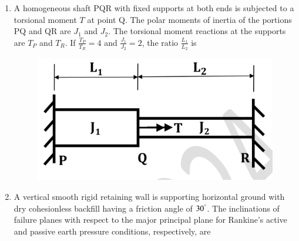 \documentclass[journal]{IEEEtran}
\begin{document}
\begin{enumerate}
\item A homogeneous shaft PQR with fixed supports at both ends is subjected to a torsional moment $T$ at point Q. The polar moments of inertia of the portions PQ and QR are $J_1$ and $J_2$. The torsional moment reactions at the supports are $T_P$ and $T_R$.  
If $\tfrac{T_P}{T_R} = 4$ and $\tfrac{J_1}{J_2} = 2$, the ratio $\tfrac{L_1}{L_2}$ is  
\hfill {}  

\begin{figure}[H]
    \centering
    \includegraphics[width=0.6\columnwidth]{figs/Q40.png} 
    \caption{}
    \label{fig:placeholder}
\end{figure}

\begin{enumerate}
\end{enumerate}

\item A vertical smooth rigid retaining wall is supporting horizontal ground with dry cohesionless backfill having a friction angle of $30^\degree$. The inclinations of failure planes with respect to the major principal plane for Rankine's active and passive earth pressure conditions, respectively, are  
\hfill {}  
\begin{enumerate}
\end{enumerate}


\end{enumerate}
\end{document}
